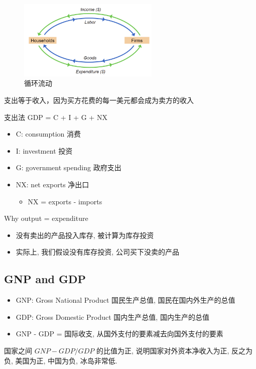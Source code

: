 \begin{figure}[htbp]
    \centering
    \includegraphics[width=0.6\textwidth]{image/CircularFIOW.png}
    \caption{循环流动}
\end{figure}
\begin{note}
    支出等于收入，因为买方花费的每一美元都会成为卖方的收入
\end{note}
\begin{definition}
    支出法 GDP = C + I + G + NX 
    \begin{itemize}
        \item C: consumption 消费
        \item I: investment 投资
        \item G: government spending 政府支出
        \item NX: net exports 净出口
        \begin{itemize}
            \item NX = exports - imports 
        \end{itemize}
    \end{itemize}
\end{definition}

\begin{problem}
    Why output = expenditure
\end{problem}
\begin{itemize}
    \item 没有卖出的产品投入库存, 被计算为库存投资
    \item 实际上, 我们假设没有库存投资, 公司买下没卖的产品
\end{itemize}

\subsection{GNP and GDP}
\begin{itemize}
    \item GNP: Gross National Product 国民生产总值, 国民在国内外生产的总值
    \item GDP: Gross Domestic Product 国内生产总值, 国内生产的总值
    \item GNP - GDP = 国际收支, 从国外支付的要素减去向国外支付的要素
\end{itemize}
\begin{note}
国家之间 $GNP - GDP / GDP$ 的比值为正, 说明国家对外资本净收入为正, 反之为负, 美国为正, 中国为负, 冰岛非常低.
\end{note}
